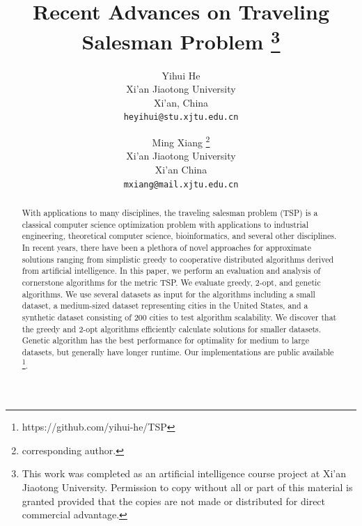 \documentclass[10pt,twocolumn,letterpaper]{article}
\begin{document}
\title{Recent Advances on Traveling Salesman Problem
\thanks{ This work was completed as an artificial intelligence course project at Xi'an Jiaotong University. Permission to copy without all or part of this material is granted provided that the copies are not made or distributed for direct commercial advantage.}
}

\author{Yihui He\\
Xi'an Jiaotong University\\
Xi'an, China\\
{\tt\small heyihui@stu.xjtu.edu.cn}
\and
Ming Xiang
\thanks{corresponding author.}\\
Xi'an Jiaotong University\\
Xi'an China\\
{\tt\small mxiang@mail.xjtu.edu.cn}
}

\maketitle

\begin{abstract}
With applications to many disciplines, the traveling salesman problem (TSP) is a classical computer science optimization problem with applications to industrial engineering, theoretical computer science, bioinformatics, and several other disciplines\cite{introduction}. In recent years, there have been a
plethora of novel approaches for approximate solutions ranging from simplistic greedy to cooperative distributed algorithms derived from artificial intelligence. In this paper,
we perform an evaluation and analysis of cornerstone algorithms for the metric TSP. We evaluate greedy, 2-opt, and genetic algorithms. We use
several datasets as input for the algorithms including a small dataset, a medium-sized dataset representing
cities in the United States, and a synthetic dataset consisting of 200 cities to test algorithm scalability. We discover that
the greedy and 2-opt algorithms efficiently calculate solutions for smaller datasets. Genetic algorithm has the best
performance for optimality for medium
to large datasets, but generally have longer runtime. Our implementations are public available \footnote{https://github.com/yihui-he/TSP}.
\end{abstract}
\end{document}

